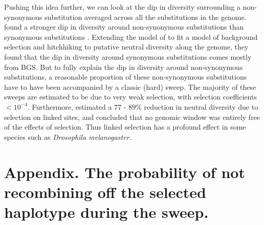 Pushing this idea further, we can look at the dip in diversity
surrounding a non-synonymous substitution averaged across all the
substitutions in the genome. \citet{elyashiv2016genomic} found a
stronger dip in diversity around non-synonymous substitutions than
synonymous substitutions \citep[see also
][]{sattath2011pervasive}. Extending
the model of \citet{Mcvicker:09} to fit a model of background selection and
hitchhiking to putative neutral diversity along the genome, they found that
the dip in diversity around synonymous substitutions comes mostly from
BGS. But to fully explain the dip in diversity around non-synonymous
substitutions, a reasonable proportion of these non-synonymous
substitutions have to have been accompanied by a classic (hard)
sweep. The majority of these sweeps are estimated to be due to very
weak selection, with selection coefficients $<10^{-4}$. Furthermore, \citet{elyashiv2016genomic} estimated a
 $77$ - $89\%$ reduction in neutral diversity due to selection on linked sites, and concluded that no genomic window was entirely
free of the effects of selection. Thus linked selection has a profound
effect in some species such as {\it Drosophila melanogaster}. 



\section{Appendix. The probability of not recombining off the selected
  haplotype during the sweep.} \label{Appendix:no_recom_sweep}

